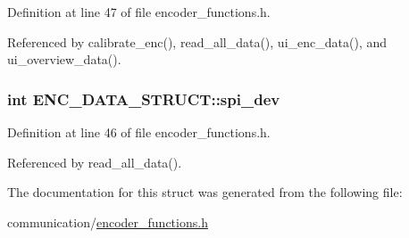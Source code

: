 Definition at line 47 of file encoder\-\_\-functions.\-h.



Referenced by calibrate\-\_\-enc(), read\-\_\-all\-\_\-data(), ui\-\_\-enc\-\_\-data(), and ui\-\_\-overview\-\_\-data().

\hypertarget{structENC__DATA__STRUCT_a93b8e925392a12a8874bf59f2a1cd76a}{
\subsubsection[{spi\-\_\-dev}]{\setlength{\rightskip}{0pt plus 5cm}int E\-N\-C\-\_\-\-D\-A\-T\-A\-\_\-\-S\-T\-R\-U\-C\-T\-::spi\-\_\-dev}}\label{structENC__DATA__STRUCT_a93b8e925392a12a8874bf59f2a1cd76a}


Definition at line 46 of file encoder\-\_\-functions.\-h.



Referenced by read\-\_\-all\-\_\-data().



The documentation for this struct was generated from the following file\-:\begin{DoxyCompactItemize}
\item 
communication/\hyperlink{encoder__functions_8h}{encoder\-\_\-functions.\-h}\end{DoxyCompactItemize}
